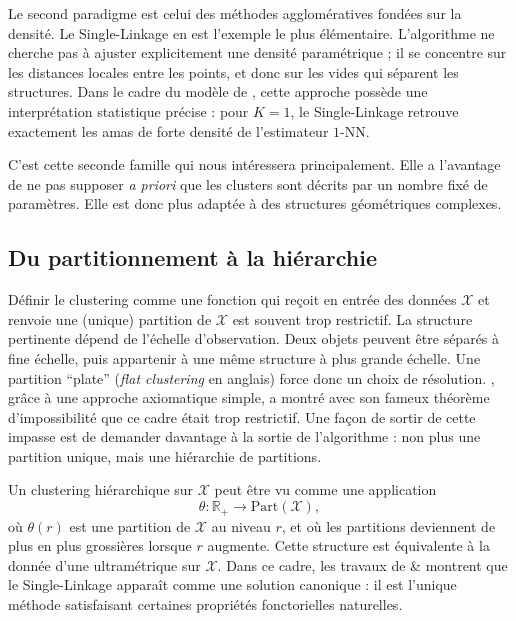 Le second paradigme est celui des méthodes agglomératives fondées sur la densité. Le Single-Linkage en est l'exemple le plus élémentaire. L'algorithme ne cherche pas à ajuster explicitement une densité paramétrique ; il se concentre sur les distances locales entre les points, et donc sur les vides qui séparent les structures. Dans le cadre du modèle de , cette approche possède une interprétation statistique précise : pour $K=1$, le Single-Linkage retrouve exactement les amas de forte densité de l'estimateur $1$-NN.

C'est cette seconde famille qui nous intéressera principalement. Elle a l'avantage de ne pas supposer \emph{a priori} que les clusters sont décrits par un nombre fixé de paramètres. Elle est donc plus adaptée à des structures géométriques complexes. 

\subsection{Du partitionnement à la hiérarchie}

Définir le clustering comme une fonction qui reçoit en entrée des données $\mathcal X$ et renvoie une (unique) partition de $\mathcal X$ est souvent trop restrictif. La structure pertinente dépend de l'échelle d'observation. Deux objets peuvent être séparés à fine échelle, puis appartenir à une même structure à plus grande échelle. Une partition ``plate'' (\emph{flat clustering} en anglais) force donc un choix de résolution.
, grâce à une approche axiomatique simple, a montré avec son fameux théorème d'impossibilité \cite{Kleinberg2002} que ce cadre était trop restrictif.
Une façon de sortir de cette impasse est de demander davantage à la sortie de l'algorithme : non plus une partition unique, mais une hiérarchie de partitions.

Un clustering hiérarchique sur $\mathcal X$ peut être vu comme une application
\[
    \theta : \mathbb{R}_+ \longrightarrow \mathrm{Part}(\mathcal X),
\]
où $\theta(r)$ est une partition de $\mathcal X$ au niveau $r$, et où les partitions deviennent de plus en plus grossières lorsque $r$ augmente. 
Cette structure est équivalente à la donnée d'une ultramétrique sur $\mathcal X$. 
Dans ce cadre, les travaux de  \&  \cite{CarlssonMemoli2010} montrent que le Single-Linkage apparaît comme une solution canonique : il est l'unique méthode satisfaisant certaines propriétés fonctorielles naturelles.

